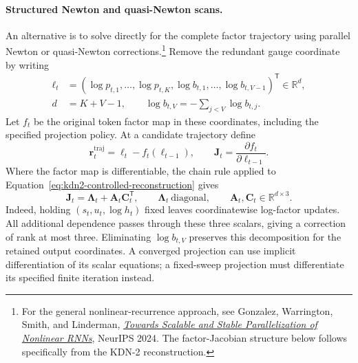 \documentclass[11pt]{article}
\newcommand{\R}{\mathbb{R}}
\newcommand{\ve}[1]{\boldsymbol{#1}}
\newcommand{\tr}{\mathsf{T}}
\begin{document}
\paragraph{Structured Newton and quasi-Newton scans.}
An alternative is to solve directly for the complete factor trajectory using parallel Newton
or quasi-Newton corrections.\footnote{For the general nonlinear-recurrence approach, see
Gonzalez, Warrington, Smith, and Linderman,
\href{https://arxiv.org/abs/2407.19115}{\emph{Towards Scalable and Stable Parallelization of
Nonlinear RNNs}}, NeurIPS 2024.  The factor-Jacobian structure below follows specifically from
the KDN-2 reconstruction.}
Remove the redundant gauge coordinate by writing
\begin{equation}
\begin{aligned}
  \ve{\ell}_t
  &=(\log p_{t,1},\ldots,\log p_{t,K},
     \log b_{t,1},\ldots,\log b_{t,V-1})^{\tr}\in\R^d,\\
  d&=K+V-1,
  \qquad \log b_{t,V}=-\sum_{j<V}\log b_{t,j}.
\end{aligned}
  \label{eq:kdn2-factor-log-chart}
\end{equation}
Let $f_t$ be the original token factor map in these coordinates, including the specified
projection policy.  At a candidate trajectory define
\begin{equation}
  \ve{r}^{\mathrm{traj}}_t=\ve{\ell}_t-f_t(\ve{\ell}_{t-1}),
  \qquad
  \ve{J}_t=\frac{\partial f_t}{\partial\ve{\ell}_{t-1}}.
  \label{eq:kdn2-factor-trajectory-residual}
\end{equation}
Where the factor map is differentiable, the chain rule applied to
Equation~\eqref{eq:kdn2-controlled-reconstruction} gives
\begin{equation}
  \ve{J}_t=\ve{\Lambda}_t+\ve{A}_t\ve{C}_t^{\tr},
  \qquad
  \ve{\Lambda}_t\ \text{diagonal},
  \qquad
  \ve{A}_t,\ve{C}_t\in\R^{d\times3}.
  \label{eq:kdn2-factor-jacobian-structure}
\end{equation}
Indeed, holding $(s_t,u_t,\log h_t)$ fixed leaves coordinatewise log-factor updates.  All
additional dependence passes through these three scalars, giving a correction of rank at most
three.  Eliminating $\log b_{t,V}$ preserves this decomposition for the retained output
coordinates.  A converged projection can use implicit differentiation of its scalar equations;
a fixed-sweep projection must differentiate its specified finite iteration instead.
\end{document}
